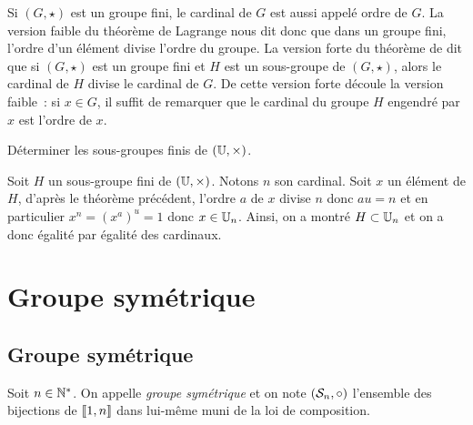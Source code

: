 \documentclass{magnolia}
\begin{document}
\begin{remarques}
\remarque Si $(G,\star)$ est un groupe fini, le cardinal de $G$ est aussi appelé
  ordre de $G$. La version faible du théorème de Lagrange nous dit donc que
  dans un groupe fini, l'ordre d'un élément divise l'ordre du groupe.
\remarque La version forte du théorème de  dit que si $(G,\star)$ est
  un groupe fini et $H$ est un sous-groupe de $(G,\star)$, alors le
  cardinal de $H$ divise le cardinal de $G$. De cette version forte découle
  la version faible~: si $x\in G$, il suffit de remarquer que le cardinal du
  groupe $H$ engendré par $x$ est l'ordre de $x$.
\end{remarques}

\begin{exoUnique}
\exo Déterminer les sous-groupes finis de $(\U,\times)$. 
\begin{sol}
Soit $H$ un sous-groupe fini de $(\U,\times)$.  Notons $n$ son cardinal. Soit $x$ un élément de $H$, d'après le théorème précédent, l'ordre $a$ de $x$ divise $n$ donc $au=n$ et en particulier $x^n=(x^a)^u=1$ donc $x\in \U[n]$. Ainsi, on a montré $H\subset \U[n]$ et on a donc égalité par égalité des cardinaux.
\end{sol}
\end{exoUnique}



\section{Groupe symétrique}
\subsection{Groupe symétrique}

\begin{definition}
Soit $n\in{\mathbb{N}^*}$. On appelle \emph{groupe symétrique} et on note $\left(\mathcal{S}_{n},\circ\right)$
l'ensemble des bijections de $\left\llbracket 1,n\right\rrbracket$ dans lui-même muni de la loi de
composition.
\end{definition}
\end{document}
